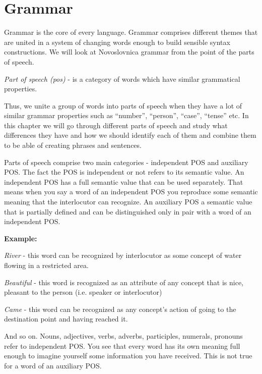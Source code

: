 \chapter{Grammar}

Grammar is the core of every language. Grammar comprises different themes that are united in a system of changing words enough to build sensible syntax constructions. We will look at Novoslovnica grammar from the point of the parts of speech.


\textit{Part of speech (\gls{pos})} - is a category of words which have similar grammatical properties.

Thus, we unite a group of words into parts of speech when they have a lot of similar grammar properties such as “number”, “person”, “case”, “tense” etc. In this chapter we will go through different parts of speech and study what differences they have and how we should identify each of them and combine them to be able of creating phrases and sentences. 

Parts of speech comprise two main categories - independent POS and auxiliary POS. The fact the POS is independent or not refers to its semantic value. An independent POS has a full semantic value that can be used separately.  That means when you say a word of an independent POS you reproduce some semantic meaning that the interlocutor can recognize. An auxiliary POS a semantic value that is partially defined and can be distinguished only in pair with a word of an independent POS.

\textbf{Example:}

\textit{River} - this word can be recognized by interlocutor as some concept of water flowing in a restricted area.

\textit{Beautiful} - this word is recognized as an attribute of any concept that is nice, pleasant to the person (i.e. speaker or interlocutor)

\textit{Came} - this word can be recognized as any concept’s action of going to the destination point and having reached it. 

And so on. Nouns, adjectives, verbs, adverbs, participles, numerals, pronouns refer to independent POS. You see that every word has its own meaning full enough to imagine yourself some information you have received. This is not true for a word of an auxiliary POS. 

